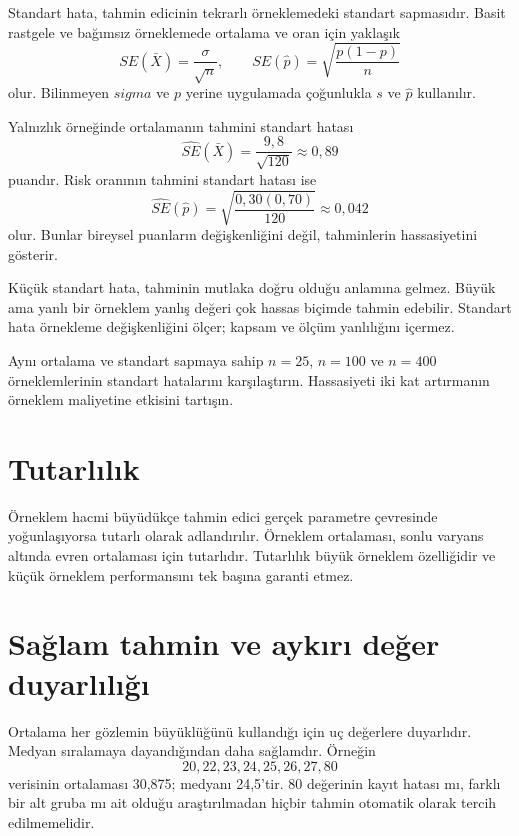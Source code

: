 Standart hata, tahmin edicinin tekrarlı örneklemedeki standart sapmasıdır.
Basit rastgele ve bağımsız örneklemede ortalama ve oran için yaklaşık
\[
SE(\bar X)=\frac{\sigma}{\sqrt n},
\qquad
SE(\hat p)=\sqrt{\frac{p(1-p)}{n}}
\]
olur. Bilinmeyen $sigma$ ve $p$ yerine uygulamada çoğunlukla $s$ ve
$\hat p$ kullanılır.

Yalnızlık örneğinde ortalamanın tahmini standart hatası
\[
\widehat{SE}(\bar X)=\frac{9{,}8}{\sqrt{120}}\approx0{,}89
\]
puandır. Risk oranının tahmini standart hatası ise
\[
\widehat{SE}(\hat p)
=\sqrt{\frac{0{,}30(0{,}70)}{120}}
\approx0{,}042
\]
olur. Bunlar bireysel puanların değişkenliğini değil, tahminlerin
hassasiyetini gösterir.

\begin{mistakebox}
Küçük standart hata, tahminin mutlaka doğru olduğu anlamına gelmez. Büyük ama
yanlı bir örneklem yanlış değeri çok hassas biçimde tahmin edebilir. Standart
hata örnekleme değişkenliğini ölçer; kapsam ve ölçüm yanlılığını içermez.
\end{mistakebox}

\begin{etkinlik}
Aynı ortalama ve standart sapmaya sahip $n=25$, $n=100$ ve $n=400$
örneklemlerinin standart hatalarını karşılaştırın. Hassasiyeti iki kat
artırmanın örneklem maliyetine etkisini tartışın.
\end{etkinlik}

\section{Tutarlılık}

Örneklem hacmi büyüdükçe tahmin edici gerçek parametre çevresinde yoğunlaşıyorsa
tutarlı olarak adlandırılır. Örneklem ortalaması, sonlu varyans altında evren
ortalaması için tutarlıdır. Tutarlılık büyük örneklem özelliğidir ve küçük
örneklem performansını tek başına garanti etmez.

\section{Sağlam tahmin ve aykırı değer duyarlılığı}

Ortalama her gözlemin büyüklüğünü kullandığı için uç değerlere duyarlıdır.
Medyan sıralamaya dayandığından daha sağlamdır. Örneğin
\[
20,22,23,24,25,26,27,80
\]
verisinin ortalaması 30,875; medyanı 24,5'tir. 80 değerinin kayıt hatası mı,
farklı bir alt gruba mı ait olduğu araştırılmadan hiçbir tahmin otomatik olarak
tercih edilmemelidir.

